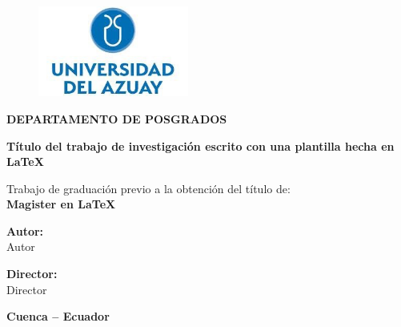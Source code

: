 \newpage
\begin{titlepage}
    \begin{center}
        \begin{figure}[htb!]
        	\centering
        		\includegraphics[height=1.17in]{img/logo_uda23.jpg}
        	\label{fig:logoUda2023}
        \end{figure}
        \vspace{1cm}
        
        \Large{\textbf{DEPARTAMENTO DE POSGRADOS}}\\
        \vspace{1.5cm}
        
        \Large{\textbf{Título del trabajo de investigación escrito con una plantilla hecha en \LaTeX }}\\
        \vspace{2cm}
        
        \large{Trabajo de graduación previo a la obtención del título de:}\\
        \vspace{0.5cm}
        \large{\textbf{Magister en \LaTeX }}
        \vspace{1.5cm}

        \large{\textbf{Autor:}}\\
        \vspace{0.5cm}
        \large{Autor}\\
        \vspace{1.5cm}

        \large{\textbf{Director:}}\\
        \vspace{0.5cm}
        \large{Director}
        \vspace{1.5cm}

        \large{\textbf{Cuenca – Ecuador}}\\
        \vspace{0.5cm}
        \large{\textbf{\the\year}}
        \vspace{1cm}
    \end{center}
\end{titlepage}